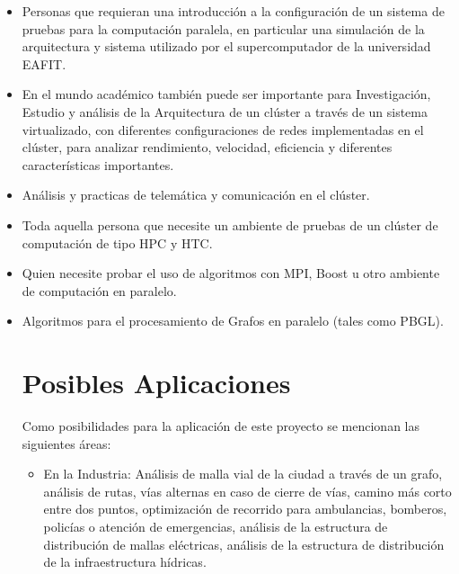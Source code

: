 \begin{itemize}
	
	\item Personas que requieran una introducción a la configuración de un sistema de pruebas para la computación paralela, en particular una simulación de la arquitectura y sistema utilizado por el supercomputador de la universidad EAFIT.

	\item En el mundo académico también puede ser importante para Investigación, Estudio y análisis de la Arquitectura de un clúster a través de un sistema virtualizado, con diferentes configuraciones de redes implementadas en el clúster, para analizar rendimiento, velocidad, eficiencia y diferentes características importantes. 


	\item Análisis y practicas de telemática y comunicación en el clúster. 

	\item Toda aquella persona que necesite un ambiente de pruebas de un clúster de computación de tipo HPC y HTC.

	\item Quien necesite probar el uso de algoritmos con MPI, Boost u otro ambiente de computación en paralelo.

	\item Algoritmos para el procesamiento de Grafos en paralelo (tales como PBGL).

	\section{Posibles Aplicaciones}

	Como posibilidades para la aplicación de este proyecto se mencionan las siguientes áreas: 

	\begin{itemize}
		\item En la Industria: Análisis de malla vial de la ciudad a través de un grafo, análisis de rutas, vías alternas en caso de cierre de vías, camino más corto entre dos puntos, optimización de recorrido para ambulancias, bomberos, policías o atención de emergencias, análisis de la estructura de distribución de mallas eléctricas, análisis de la estructura de distribución de la infraestructura hídricas.



\end{itemize}
\end{itemize}
